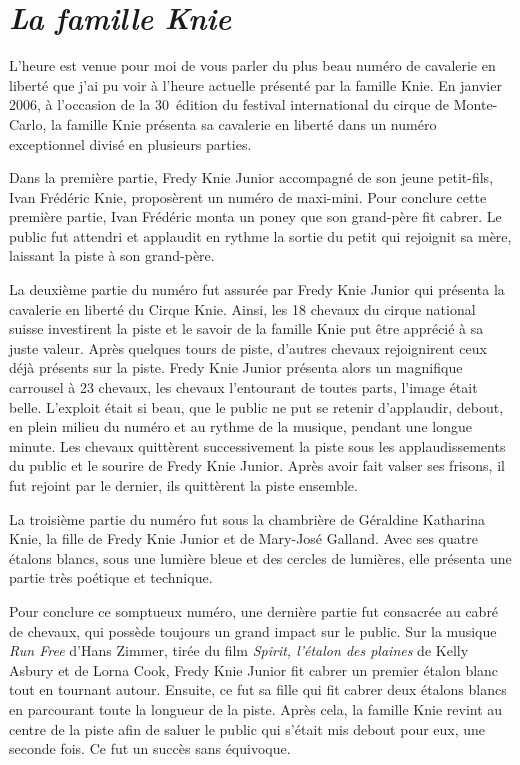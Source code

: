 \section*{\textit{La famille Knie}}
{}

L’heure est venue pour moi de vous parler du plus beau numéro de cavalerie en liberté que j’ai pu voir à l’heure actuelle présenté par la famille Knie. En janvier 2006, à l’occasion de la 30\ieme~édition du festival international du cirque de Monte-Carlo, la famille Knie présenta sa cavalerie en liberté dans un numéro exceptionnel divisé en plusieurs parties. 

Dans la première partie, Fredy Knie Junior accompagné de son jeune petit-fils, Ivan Frédéric Knie, proposèrent un numéro de maxi-mini. Pour conclure cette première partie, Ivan Frédéric monta un poney que son grand-père fit cabrer. Le public fut attendri et applaudit en rythme la sortie du petit qui rejoignit sa mère, laissant la piste à son grand-père. 

La deuxième partie du numéro fut assurée par Fredy Knie Junior qui présenta la cavalerie en liberté du Cirque Knie. Ainsi, les 18 chevaux du cirque national suisse investirent la piste et le savoir de la famille Knie put être apprécié à sa juste valeur. Après quelques tours de piste, d’autres chevaux rejoignirent ceux déjà présents sur la piste. Fredy Knie Junior présenta alors un magnifique carrousel à 23 chevaux, les chevaux l’entourant de toutes parts, l’image était belle. L’exploit était si beau, que le public ne put se retenir d’applaudir, debout, en plein milieu du numéro et au rythme de la musique, pendant une longue minute. Les chevaux quittèrent successivement la piste sous les applaudissements du public et le sourire de Fredy Knie Junior. Après avoir fait valser ses frisons, il fut rejoint par le dernier, ils quittèrent la piste ensemble.

La troisième partie du numéro fut sous la chambrière de Géraldine Katharina Knie, la fille de Fredy Knie Junior et de Mary-José Galland. Avec ses quatre étalons blancs, sous une lumière bleue et des cercles de lumières, elle présenta une partie très poétique et technique. 

Pour conclure ce somptueux numéro, une dernière partie fut consacrée au cabré de chevaux, qui possède toujours un grand impact sur le public. Sur la musique \textit{Run Free} d’Hans Zimmer, tirée du film \textit{Spirit, l'étalon des plaines} de Kelly Asbury et de Lorna Cook, Fredy Knie Junior fit cabrer un premier étalon blanc tout en tournant autour. Ensuite, ce fut sa fille qui fit cabrer deux étalons blancs en parcourant toute la longueur de la piste. Après cela, la famille Knie revint au centre de la piste afin de saluer le public qui s’était mis debout pour eux, une seconde fois. Ce fut un succès sans équivoque. 


\thispagestyle{empty} %

